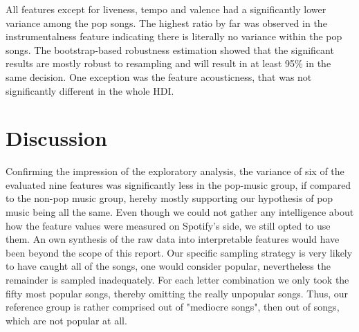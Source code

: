 \documentclass{article}
\begin{document}

All features except for liveness, tempo and valence had a significantly lower variance among the pop songs. The highest ratio by far was observed in the instrumentalness feature indicating there is literally no variance within the pop songs.
The bootstrap-based robustness estimation showed that the significant results are mostly robust to resampling and will result in at least 95\% in the same decision. One exception was the feature acousticness, that was not significantly different in the whole HDI.

\section{Discussion}
Confirming the impression of the exploratory analysis, the variance of six of the evaluated nine features was significantly less in the pop-music group, if compared to the non-pop music group, hereby mostly supporting our hypothesis of pop music being all the same.
Even though we could not gather any intelligence about how the feature values were measured on Spotify's side, we still opted to use them. An own synthesis of the raw data into interpretable features would have been beyond the scope of this report. 
Our specific sampling strategy is very likely to have caught all of the songs, one would consider popular, nevertheless the remainder is sampled inadequately. For each letter combination we only took the fifty most popular songs, thereby omitting the really unpopular songs. Thus, our reference group is rather comprised out of "mediocre songs", then out of songs, which are not popular at all.   
\end{document}
